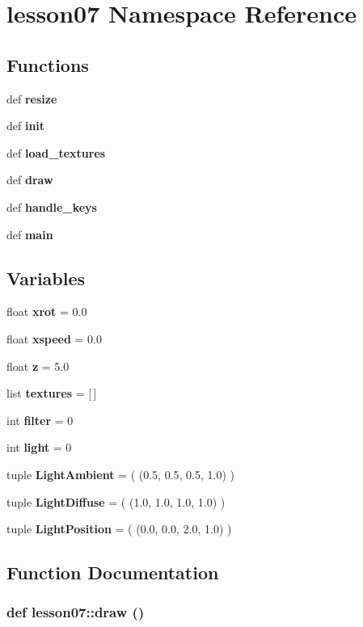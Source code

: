 \section{lesson07 Namespace Reference}
\label{namespacelesson07}


\subsection*{Functions}
\begin{CompactItemize}
\item 
def {\bf resize}
\item 
def {\bf init}
\item 
def {\bf load\_\-textures}
\item 
def {\bf draw}
\item 
def {\bf handle\_\-keys}
\item 
def {\bf main}
\end{CompactItemize}
\subsection*{Variables}
\begin{CompactItemize}
\item 
float {\bf xrot} = 0.0
\item 
float {\bf xspeed} = 0.0
\item 
float {\bf z} = 5.0
\item 
list {\bf textures} = [$\,$]
\item 
int {\bf filter} = 0
\item 
int {\bf light} = 0
\item 
tuple {\bf LightAmbient} = ( (0.5, 0.5, 0.5, 1.0) )
\item 
tuple {\bf LightDiffuse} = ( (1.0, 1.0, 1.0, 1.0) )
\item 
tuple {\bf LightPosition} = ( (0.0, 0.0, 2.0, 1.0) )
\end{CompactItemize}


\subsection{Function Documentation}
\subsubsection{\setlength{\rightskip}{0pt plus 5cm}def lesson07::draw ()}\label{namespacelesson07_9c5334cfa9d6dc273c257651ca1f03bf}




